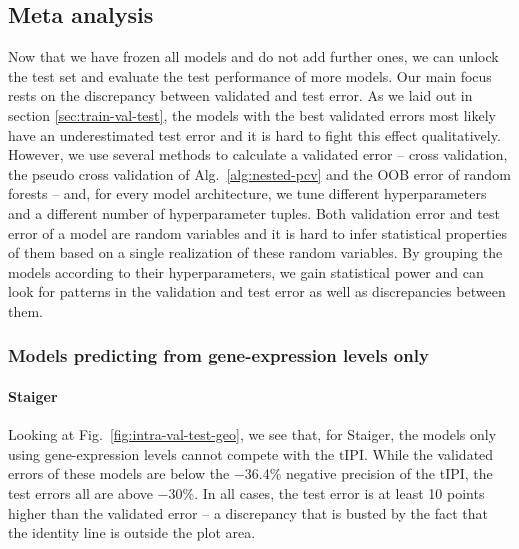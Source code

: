 \subsection{Meta analysis}\label{subsec:results-intra-meta}

Now that we have frozen all models and do not add further ones, we can unlock the test set and 
evaluate the test performance of more models. Our main focus rests on the discrepancy between 
validated and test error. As we laid out in section \ref{sec:train-val-test}, the models with the 
best validated errors most likely have an underestimated test error and it is hard to fight this 
effect qualitatively. However, we use several methods to calculate a validated error -- cross 
validation, the pseudo cross validation of Alg.\ \ref{alg:nested-pcv} and the OOB error of random 
forests -- and, for every model architecture, we tune different hyperparameters and a different 
number of hyperparameter tuples. Both validation error and test error of a model are random 
variables and it is hard to infer statistical properties of them based on a single realization of 
these random variables. By grouping the models according to their hyperparameters, we gain 
statistical power and can look for patterns in the validation and test error as well as 
discrepancies between them.

\subsubsection{Models predicting from gene-expression levels only}



\paragraph{Staiger}
Looking at Fig.\ \ref{fig:intra-val-test-geo}, we see that, for Staiger, the models only using 
gene-expression levels cannot compete with the $\text{tIPI}$. While the validated errors of these 
models are 
below the \num{-36.4}\% negative precision of the tIPI, the test errors all are above \num{-30}\%. 
In all cases, the test error is at least 10 points higher than the validated error -- a discrepancy 
that is busted by the fact that the identity line is outside the plot area.  

